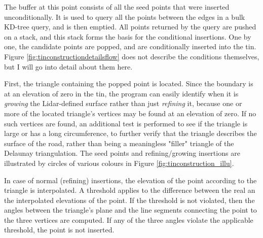 The buffer at this point consists of all the seed points that were inserted unconditionally. It is used to query all the points between the edges in a bulk KD-tree query, and is then emptied. All points returned by the query are pushed on a stack, and this stack forms the basis for the conditional insertions. One by one, the candidate points are popped, and are conditionally inserted into the \ac{tin}. Figure \ref{fig:tinconstructiondetailsflow} does not describe the conditions themselves, but I will go into detail about them here.

First, the triangle containing the popped point is located. Since the boundary is at an elevation of zero in the \ac{tin}, the program can easily identify when it is \textit{growing} the Lidar-defined surface rather than just \textit{refining} it, because one or more of the located triangle's vertices may be found at an elevation of zero. If no such vertices are found, an additional test is performed to see if the triangle is large or has a long circumference, to further verify that the triangle describes the surface of the road, rather than being a meaningless "filler" triangle of the Delaunay triangulation. The seed points and refining/growing insertions are illustrated by circles of various colours in Figure \ref{fig:tinconstruction_illu}.

In case of normal (refining) insertions, the elevation of the point according to the triangle is interpolated. A threshold applies to the difference between the real an the interpolated elevations of the point. If the threshold is not violated, then the angles between the triangle's plane and the line segments connecting the point to the three vertices are computed. If any of the three angles violate the applicable threshold, the point is not inserted.

